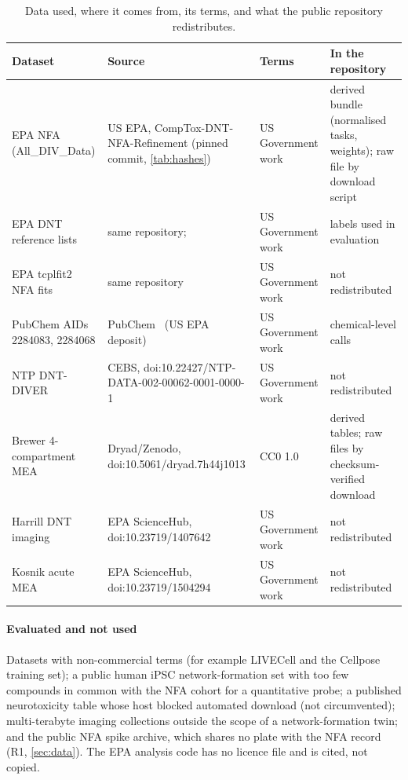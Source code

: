 \documentclass[11pt,a4paper]{article}
\begin{document}
\begin{table}[!ht]
\centering\footnotesize
\caption{Data used, where it comes from, its terms, and what the public repository redistributes.}\label{tab:licences}
\begin{tabularx}{\linewidth}{@{}P{3.3cm}LP{2.6cm}P{3.4cm}@{}}
\toprule
Dataset & Source & Terms & In the repository \\
\midrule
EPA NFA (All\_DIV\_Data) & US EPA, CompTox-DNT-NFA-Refinement (pinned commit, \cref{tab:hashes}) & US Government work & derived bundle (normalised tasks, weights); raw file by download script \\
EPA DNT reference lists & same repository; \cite{mundy2015expanding,mundy2024recommended} & US Government work & labels used in evaluation \\
EPA tcplfit2 NFA fits & same repository & US Government work & not redistributed \\
PubChem AIDs 2284083, 2284068 & PubChem~\cite{kim2023pubchem} (US EPA deposit) & US Government work & chemical-level calls \\
NTP DNT-DIVER & CEBS, doi:10.22427/NTP-DATA-002-00062-0001-0000-1 & US Government work & not redistributed \\
Brewer 4-compartment MEA & Dryad/Zenodo, doi:10.5061/dryad.7h44j1013 & CC0 1.0 & derived tables; raw files by checksum-verified download \\
Harrill DNT imaging & EPA ScienceHub, doi:10.23719/1407642 & US Government work & not redistributed \\
Kosnik acute MEA & EPA ScienceHub, doi:10.23719/1504294 & US Government work & not redistributed \\
\bottomrule
\end{tabularx}
\end{table}

\paragraph{Evaluated and not used}
Datasets with non-commercial terms (for example LIVECell and the Cellpose training set); a public human iPSC
network-formation set with too few compounds in common with the NFA cohort for a quantitative probe; a published
neurotoxicity table whose host blocked automated download (not circumvented); multi-terabyte imaging collections
outside the scope of a network-formation twin; and the public NFA spike archive, which shares no plate with the
NFA record (R1, \cref{sec:data}). The EPA analysis code has no licence file and is cited, not copied.
\end{document}
